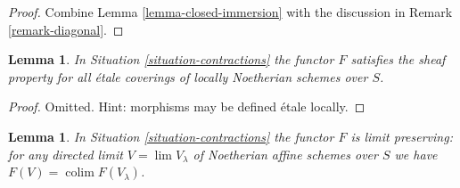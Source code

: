 \documentclass{stacks-project}
\theoremstyle{plain}
\newtheorem{lemma}[subsection]{Lemma}
\theoremstyle{definition}
\theoremstyle{remark}
\numberwithin{equation}{subsection}
\def\lim{\mathop{\mathrm{lim}}\nolimits}
\def\colim{\mathop{\mathrm{colim}}\nolimits}
\begin{document}
\begin{proof}
Combine Lemma \ref{lemma-closed-immersion}
with the discussion in Remark \ref{remark-diagonal}.
\end{proof}

\begin{lemma}
\label{lemma-sheaf}
In Situation \ref{situation-contractions} the functor
$F$ satisfies the sheaf property for all \'etale coverings
of locally Noetherian schemes over $S$.
\end{lemma}

\begin{proof}
Omitted. Hint: morphisms may be defined \'etale locally.
\end{proof}

\begin{lemma}
\label{lemma-limit-preserving}
In Situation \ref{situation-contractions} the functor $F$ is limit preserving:
for any directed limit $V = \lim V_\lambda$ of Noetherian affine schemes
over $S$ we have $F(V) = \colim F(V_\lambda)$.
\end{lemma}
\end{document}
